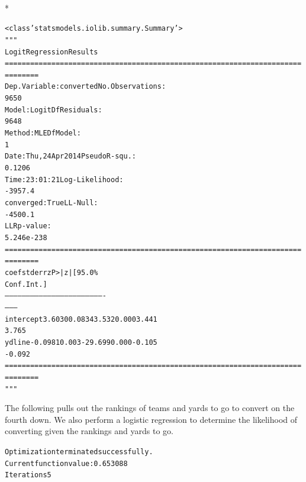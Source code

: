 \documentclass[letterpaper,10pt,english]{/anaconda/lib/python2.7/site-packages/sphinx/texinputs/sphinxhowto}
\def\smaller{\fontsize{9.5pt}{9.5pt}\selectfont}
\newenvironment{InvisibleVerbatim}
        {\begin{mdframed}[leftmargin=0.1\linewidth,innerleftmargin=3pt,innerrightmargin=3pt, userdefinedwidth=1\linewidth, linewidth=0pt, linecolor=white, usetwoside=false]}
        {\end{mdframed}}
\begin{document}
                \makebox[0.1\linewidth]{\smaller\hfill\tt\color{nbframe-out-prompt}Out\hspace{4pt}{[}17{]}:\hspace{4pt}}\\*
                \vspace{-2.55\baselineskip}\begin{InvisibleVerbatim}
                \vspace{-0.5\baselineskip}
\begin{alltt}<class 'statsmodels.iolib.summary.Summary'>
"""
                           Logit Regression Results
======================================================================
========
Dep. Variable:              converted   No. Observations:
9650
Model:                          Logit   Df Residuals:
9648
Method:                           MLE   Df Model:
1
Date:                Thu, 24 Apr 2014   Pseudo R-squ.:
0.1206
Time:                        23:01:21   Log-Likelihood:
-3957.4
converged:                       True   LL-Null:
-4500.1
                                        LLR p-value:
5.246e-238
======================================================================
========
                 coef    std err          z      P>|z|      [95.0\%
Conf. Int.]
----------------------------------------------------------------------
--------
intercept      3.6030      0.083     43.532      0.000         3.441
3.765
ydline        -0.0981      0.003    -29.699      0.000        -0.105
-0.092
======================================================================
========
"""\end{alltt}

            \end{InvisibleVerbatim}
            
        
    

The following pulls out the rankings of teams and yards to go to convert
on the fourth down. We also perform a logistic regression to determine
the likelihood of converting given the rankings and yards to go.

    

        
        

            
                \begin{InvisibleVerbatim}
                \vspace{-0.5\baselineskip}
\begin{alltt}Optimization terminated successfully.
         Current function value: 0.653088
         Iterations 5
\end{alltt}

            \end{InvisibleVerbatim}
            
\end{document}
